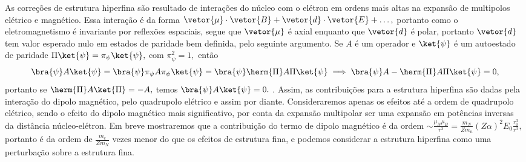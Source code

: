 As correções de estrutura hiperfina são resultado de interações do núcleo com o elétron em ordens mais altas na expansão de multipolos elétrico e magnético. Essa interação é da forma \(\vetor{\mu} \cdot \vetor{B} + \vetor{d} \cdot \vetor{E} + \dots,\) portanto como o eletromagnetismo é invariante por reflexões espaciais, segue que \(\vetor{\mu}\) é axial enquanto que \(\vetor{d}\) é polar, portanto \(\vetor{d}\) tem valor esperado nulo em estados de paridade bem definida, pelo seguinte argumento. Se \(A\) é um operador e \(\ket{\psi}\) é um autoestado de paridade \(\Pi \ket{\psi} = \pi_\psi \ket{\psi},\) com \(\pi_\psi^2 = 1,\) então
\begin{equation*}
   \bra{\psi}A \ket{\psi} = \bra{\psi}\pi_\psi A \pi_\psi \ket{\psi} = \bra{\psi} \herm{\Pi} A \Pi \ket{\psi} \implies \bra{\psi}A - \herm{\Pi}A\Pi \ket{\psi} = 0,
\end{equation*}
portanto se \(\herm{\Pi}A \ket{\Pi} = - A,\) temos \(\bra{\psi}A\ket{\psi} = 0.\) . Assim, as contribuições para a estrutura hiperfina são dadas pela interação do dipolo magnético, pelo quadrupolo elétrico e assim por diante. Consideraremos apenas os efeitos até a ordem de quadrupolo elétrico, sendo o efeito do dipolo magnético mais significativo, por conta da expansão multipolar ser uma expansão em potências inversas da distância núcleo-elétron. Em breve mostraremos que a contribuição do termo de dipolo magnético é da ordem \(\sim \frac{\mu_N \mu_B}{r^3} = \frac{m_N}{Zm_n} (Z \alpha)^2 E_0 \frac{r_0^3}{r^3},\) portanto é da ordem de \(\frac{m_e}{Zm_N}\) vezes menor do que os efeitos de estrutura fina, e podemos considerar a estrutura hiperfina como uma perturbação sobre a estrutura fina.

